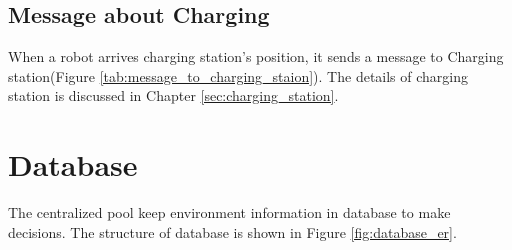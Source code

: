 \subsection{Message about Charging}
 
When a robot arrives charging station's position, it sends a message to Charging station(Figure \ref{tab:message_to_charging_staion}). The details of charging station is discussed in Chapter \ref{sec:charging_station}. 

\section{Database}
\label{sec:database}
The centralized pool keep environment information in database to make decisions. The structure of database is shown in Figure \ref{fig:database_er}.

